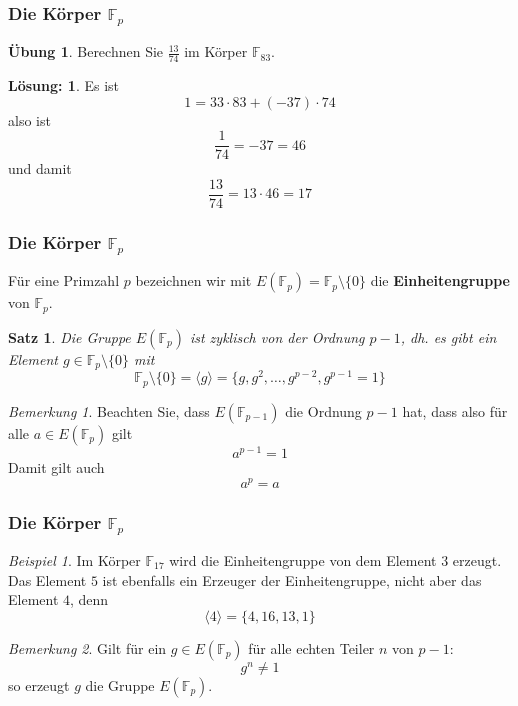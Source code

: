 \documentclass[hyperref={pdfpagelabels=false}]{beamer}
\theoremstyle{plain}%
\newtheorem*{satz}{Satz}
\theoremstyle{definition}
\newtheorem*{uebung}{Übung}
\newtheorem*{sol}{Lösung:}
\theoremstyle{remark}
\newtheorem*{beispiel}{Beispiel}
\newtheorem*{notiz}{Bemerkung}
\def \F{\mathbb F}
\begin{document}
\begin{frame}
\frametitle{Die Körper $\F_p$}

\begin{uebung}
Berechnen Sie $\frac {13}{74}$ im Körper $\F_{83}$. 
\end{uebung}

\bigbreak 

\pause \pause 

\begin{sol}
Es ist 
	$$ 1 = 33 \cdot 83 + (-37) \cdot 74 $$
also ist 
	$$ \frac {1}{74} = -37 = 46 $$
und damit 
	$$ \frac {13}{74} = 13 \cdot 46 = 17 $$
\end{sol}
\end{frame}

\begin{frame}
\frametitle{Die Körper $\F_p$}

Für eine Primzahl $p$ bezeichnen wir mit $E(\F_p) = \F_p \setminus \{0 \}$ die 
\textbf{Einheitengruppe} von $\F_p$.

\pause 

\begin{satz}
Die Gruppe $E(\F_p)$ ist zyklisch von der Ordnung $p-1$, dh. es gibt ein Element $g \in \F_p \setminus \{0 \}$ mit 
	$$ \F_p \setminus \{0 \} = \langle g \rangle =  \{g,g^2, \ldots, g^{p-2}, g^{p-1} = 1 \} $$ 
\end{satz}

\pause 

\begin{notiz}
Beachten Sie, dass $E(\F_{p-1})$ die Ordnung $p-1$ hat, dass also für alle $a \in E(\F_p)$ gilt 
	$$ a^{p-1} = 1 $$
Damit gilt auch 
	$$ a^p = a $$
\end{notiz}
\end{frame}


\begin{frame}
\frametitle{Die Körper $\F_p$}

\begin{beispiel}
Im Körper $\F_{17}$ wird die Einheitengruppe von dem Element $3$ erzeugt. Das Element $5$ ist 
ebenfalls ein Erzeuger der Einheitengruppe, nicht aber das Element $4$, denn 
	$$ \langle 4 \rangle = \{ 4, 16, 13, 1\} $$
\end{beispiel}

\pause 

\begin{notiz}
Gilt für ein $g \in E(\F_p)$ für alle echten Teiler $n$ von $p-1$: 
	$$ g^n \neq 1 $$
so erzeugt $g$ die Gruppe $E(\F_p)$.
\end{notiz}

\end{frame}
\end{document}

